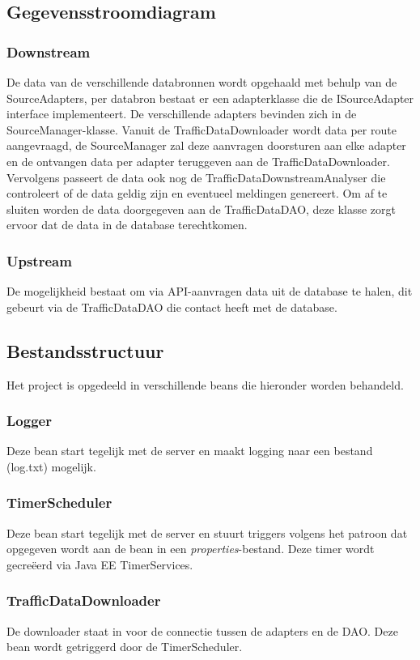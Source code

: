 \documentclass[ps,a4paper,oneside]{report}
\begin{document}
\subsection{Gegevensstroomdiagram}
\subsubsection{Downstream}
De data van de verschillende databronnen wordt opgehaald met behulp van de SourceAdapters, per databron bestaat er een adapterklasse die de ISourceAdapter interface implementeert. De verschillende adapters bevinden zich in de \\SourceManager-klasse. Vanuit de TrafficDataDownloader wordt data per route aangevraagd, de SourceManager zal deze aanvragen doorsturen aan elke adapter en de ontvangen data per adapter teruggeven aan de TrafficDataDownloader. Vervolgens passeert de data ook nog de TrafficDataDownstreamAnalyser die controleert of de data geldig zijn en eventueel meldingen genereert. Om af te sluiten worden de data doorgegeven aan de TrafficDataDAO, deze klasse zorgt ervoor dat de data in de database terechtkomen. 
\subsubsection{Upstream}
De mogelijkheid bestaat om via API-aanvragen data uit de database te halen, dit gebeurt via de TrafficDataDAO die contact heeft met de database.
\clearpage
\subsection{Bestandsstructuur}
Het project is opgedeeld in verschillende beans die hieronder worden behandeld.
\subsubsection{Logger}
Deze bean start tegelijk met de server en maakt logging naar een bestand (log.txt) mogelijk.
\subsubsection{TimerScheduler}
Deze bean start tegelijk met de server en stuurt triggers volgens het patroon dat opgegeven wordt aan de bean in een \textit{properties}-bestand. Deze timer wordt gecre\"eerd via Java EE TimerServices.
\subsubsection{TrafficDataDownloader}
De downloader staat in voor de connectie tussen de adapters en de DAO. Deze bean wordt getriggerd door de TimerScheduler.
\end{document}
